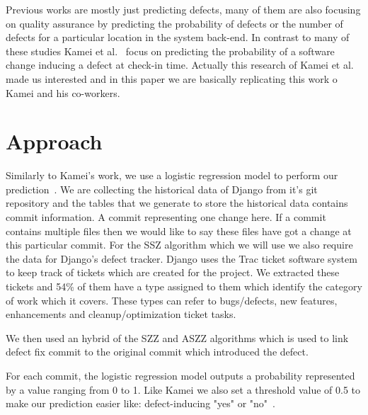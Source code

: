 \documentclass[10pt, conference]{IEEEtran}
\begin{document}
Previous works are mostly just predicting defects, many of them are also focusing on quality assurance by predicting the probability of defects or the number of defects for a particular location in the system back-end. In contrast to many of these studies Kamei et al.~\cite{Kamei2013TSE} focus on predicting the probability of a software change inducing a defect at check-in time. Actually this research of Kamei et al. made us interested and in this paper we are basically replicating this work o Kamei and his co-workers.

\section{Approach}
\label{sec:approach}



Similarly to Kamei's work, we use a logistic regression model to perform our prediction~\cite{Kamei2013TSE}. We are collecting the historical data of Django from it's git repository and the tables that we generate to store the historical data contains commit information. A commit representing one change here. If a commit contains multiple files then we would like to say these files have got a change at this particular commit. For the SSZ algorithm which we will use we also require the data for Django's defect tracker. Django uses the Trac ticket software system to keep track of tickets which are created for the project. We extracted these tickets and 54\% of them have a type assigned to them which identify the category of work which it covers. These types can refer to bugs/defects, new features, enhancements and cleanup/optimization ticket tasks. 

We then used an hybrid of the SZZ and ASZZ algorithms\cite{Sliwerski2005MSR} which is used to link defect fix commit to the original commit which introduced the defect.




For each commit, the logistic regression model outputs a probability represented by a value ranging from 0 to 1. Like Kamei we also set a threshold value of 0.5 to make our prediction easier like: defect-inducing "yes" or "no"~\cite{Gyimothy2005TSE,Guo2010ICSE}.
\end{document}
